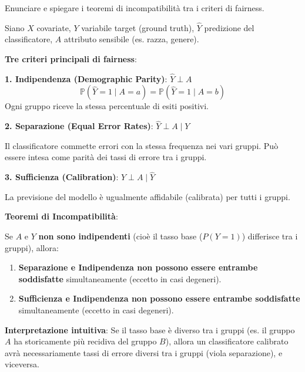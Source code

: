 \documentclass[a4paper,11pt]{article}
\begin{document}
\begin{domanda}
Enunciare e spiegare i teoremi di incompatibilit\`{a} tra i criteri di fairness.
\end{domanda}

Siano $X$ covariate, $Y$ variabile target (ground truth), $\hat{Y}$ predizione del classificatore, $A$ attributo sensibile (es. razza, genere).

\textbf{Tre criteri principali di fairness}:

\textbf{1. Indipendenza (Demographic Parity)}: $\hat{Y} \perp A$
\[
\mathbb{P}(\hat{Y} = 1 \mid A = a) = \mathbb{P}(\hat{Y} = 1 \mid A = b)
\]
Ogni gruppo riceve la stessa percentuale di esiti positivi.

\textbf{2. Separazione (Equal Error Rates)}: $\hat{Y} \perp A \mid Y$

Il classificatore commette errori con la stessa frequenza nei vari gruppi. Pu\`{o} essere intesa come parit\`{a} dei tassi di errore tra i gruppi.

\textbf{3. Sufficienza (Calibration)}: $Y \perp A \mid \hat{Y}$

La previsione del modello \`{e} ugualmente affidabile (calibrata) per tutti i gruppi.

\textbf{Teoremi di Incompatibilit\`{a}}:

\begin{tcolorbox}[colback=red!5!white, colframe=red!70!black, title=\textbf{Teorema di Impossibilit\`{a} (Chouldechova, 2017; Kleinberg et al., 2016)}]
Se $A$ e $Y$ \textbf{non sono indipendenti} (cio\`{e} il tasso base ($P(Y=1)$) differisce tra i gruppi), allora:
\begin{enumerate}
  \item \textbf{Separazione e Indipendenza non possono essere entrambe soddisfatte} simultaneamente (eccetto in casi degeneri).
  \item \textbf{Sufficienza e Indipendenza non possono essere entrambe soddisfatte} simultaneamente (eccetto in casi degeneri).
\end{enumerate}
\end{tcolorbox}

\textbf{Interpretazione intuitiva}: Se il tasso base \`{e} diverso tra i gruppi (es. il gruppo $A$ ha storicamente pi\`{u} recidiva del gruppo $B$), allora un classificatore calibrato avr\`{a} necessariamente tassi di errore diversi tra i gruppi (viola separazione), e viceversa.
\end{document}
